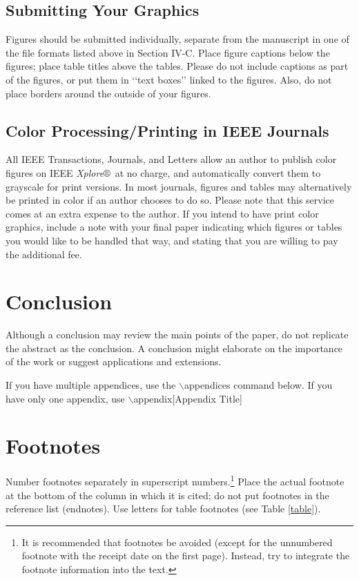 \documentclass{ieeeaccess}
\begin{document}
\subsection{Submitting Your Graphics}
Figures should be submitted individually, separate from the manuscript in one of the file formats listed above in Section IV-C. Place figure captions below the figures; place table titles above the tables. Please do not include captions as part of the figures, or put them in ‘‘text boxes’’ linked to the figures. Also, do not place borders around the outside of your figures.

\subsection{Color Processing/Printing in IEEE Journals}
All IEEE Transactions, Journals, and Letters allow an author to publish
color figures on IEEE {\it Xplore}$\circledR$\ at no charge, and automatically
convert them to grayscale for print versions. In most journals, figures and
tables may alternatively be printed in color if an author chooses to do so.
Please note that this service comes at an extra expense to the author. If
you intend to have print color graphics, include a note with your final
paper indicating which figures or tables you would like to be handled that
way, and stating that you are willing to pay the additional fee.

\section{Conclusion}
Although a conclusion may review the  main points of the paper, do not replicate the abstract as the conclusion. A
conclusion might elaborate on the importance of the work or suggest
applications and extensions.

If you have multiple appendices, use the $\backslash$appendices command below. If you have only one appendix, use
$\backslash$appendix[Appendix Title]

\appendices
\section{\break Footnotes}
Number footnotes separately in superscript numbers.\footnote{It is recommended that footnotes be avoided (except for
the unnumbered footnote with the receipt date on the first page). Instead,
try to integrate the footnote information into the text.} Place the actual
footnote at the bottom of the column in which it is cited; do not put
footnotes in the reference list (endnotes). Use letters for table footnotes
(see Table \ref{table}).
\end{document}
